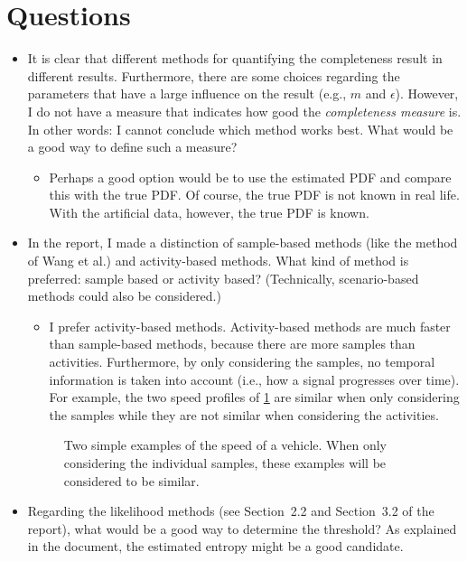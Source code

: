 \documentclass[10pt,final,a4paper,oneside,onecolumn]{article}
\newlength\figurewidth
\newlength\figureheight
\begin{document}
\section{Questions}

\begin{itemize}
	\item It is clear that different methods for quantifying the completeness result in different results. Furthermore, there are some choices regarding the parameters that have a large influence on the result (e.g., $m$ and $\epsilon$). However, I do not have a measure that indicates how good the \emph{completeness measure} is. In other words: I cannot conclude which method works best. What would be a good way to define such a measure?
	\begin{itemize}
		\item Perhaps a good option would be to use the estimated PDF and compare this with the true PDF. Of course, the true PDF is not known in real life. With the artificial data, however, the true PDF is known.
	\end{itemize}
	\item In the report, I made a distinction of sample-based methods (like the method of Wang et al.) and activity-based methods. What kind of method is preferred: sample based or activity based? (Technically, scenario-based methods could also be considered.)
	\begin{itemize}
		\item I prefer activity-based methods. Activity-based methods are much faster than sample-based methods, because there are more samples than activities. Furthermore, by only considering the samples, no temporal information is taken into account (i.e., how a signal progresses over time). For example, the two speed profiles of \cref{fig:speed example} are similar when only considering the samples while they are not similar when considering the activities.
	\end{itemize}
	\begin{figure}
		\centering
		\setlength{}
		\setlength{}
		\begin{minipage}{0.46\linewidth}
			\centering
			
		\end{minipage}
		\hspace{0.04\linewidth}
		\begin{minipage}{0.46\linewidth}
			
		\end{minipage}
		\caption{Two simple examples of the speed of a vehicle. When only considering the individual samples, these examples will be considered to be similar.}
		\label{fig:speed example}
	\end{figure}
	\item Regarding the likelihood methods (see Section~2.2 and Section~3.2 of the report), what would be a good way to determine the threshold? As explained in the document, the estimated entropy might be a good candidate. 
\end{itemize}


\printbibliography


\newpage

\end{document}
